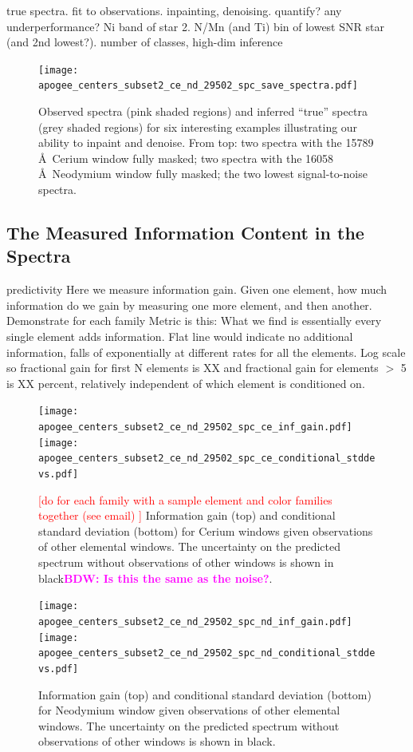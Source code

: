 \documentclass[a4paper,fleqn,usenatbib]{mnras}
\newcommand{\bdw}[1]{\textbf{\textcolor{magenta}{BDW: #1}}}
\begin{document}
true spectra. fit to observations. inpainting, denoising. quantify? any underperformance? Ni band of star 2. N/Mn (and Ti) bin of lowest SNR star (and 2nd lowest?).
number of classes, high-dim inference

\begin{figure}
	\texttt{[image: apogee\_centers\_subset2\_ce\_nd\_29502\_spc\_save\_spectra.pdf]}
    \caption{Observed spectra (pink shaded regions) and inferred ``true'' spectra (grey shaded regions) for six interesting examples illustrating our ability to inpaint and denoise. From top: two spectra with the 15789 \AA\ Cerium window fully masked; two spectra with the 16058 \AA\ Neodymium window fully masked; the two lowest signal-to-noise spectra.}
    \label{fig:inpainting_denoising_examples}
\end{figure}

\subsection{The Measured Information Content in the Spectra}

predictivity
Here we measure information gain. Given one element, how much information do we gain by measuring one more element, and then another. 
Demonstrate for each family
Metric is this: 
What we find is essentially every single element adds information. Flat line would indicate no additional information, falls of exponentially at different rates for all the elements. Log scale so fractional gain for first N elements is XX and fractional gain for elements $>$ 5 is XX percent, relatively independent of which element is conditioned on. 

\begin{figure}
	\texttt{[image: apogee\_centers\_subset2\_ce\_nd\_29502\_spc\_ce\_inf\_gain.pdf]}
	\texttt{[image: apogee\_centers\_subset2\_ce\_nd\_29502\_spc\_ce\_conditional\_stddevs.pdf]}
    \caption{\textcolor{red}{[do for each family with a sample element and color families together (see email) ]} Information gain (top) and conditional standard deviation (bottom) for Cerium windows given observations of other elemental windows. The uncertainty on the predicted spectrum without observations of other windows is shown in black\bdw{Is this the same as the noise?}.}
    \label{fig:ce_information}
\end{figure}

\begin{figure}
	\texttt{[image: apogee\_centers\_subset2\_ce\_nd\_29502\_spc\_nd\_inf\_gain.pdf]}
	\texttt{[image: apogee\_centers\_subset2\_ce\_nd\_29502\_spc\_nd\_conditional\_stddevs.pdf]}
    \caption{Information gain (top) and conditional standard deviation (bottom) for Neodymium window given observations of other elemental windows. The uncertainty on the predicted spectrum without observations of other windows is shown in black.}
    \label{fig:nd_information}
\end{figure}
\end{document}
